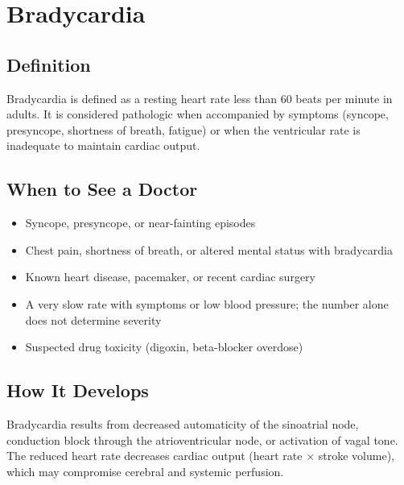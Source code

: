 \chapter{Bradycardia}

\section*{Definition}
Bradycardia is defined as a resting heart rate less than 60 beats per minute in adults. It is considered pathologic when accompanied by symptoms (syncope, presyncope, shortness of breath, fatigue) or when the ventricular rate is inadequate to maintain cardiac output.

\section*{When to See a Doctor}

\begin{itemize}
 \item Syncope, presyncope, or near-fainting episodes
 \item Chest pain, shortness of breath, or altered mental status with bradycardia
 \item Known heart disease, pacemaker, or recent cardiac surgery
 \item A very slow rate with symptoms or low blood pressure; the number alone does not determine severity
 \item Suspected drug toxicity (digoxin, beta-blocker overdose)
\end{itemize}

\section*{How It Develops}
Bradycardia results from decreased automaticity of the sinoatrial node, conduction block through the atrioventricular node, or activation of vagal tone. The reduced heart rate decreases cardiac output (heart rate $\times$ stroke volume), which may compromise cerebral and systemic perfusion.

